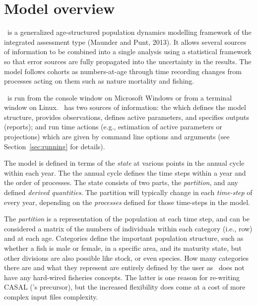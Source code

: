 \section{Model overview\label{sec:overview}}

\CNAME~is a generalized age-structured population dynamics modelling framework of the integrated assessment type (Maunder and Punt, 2013). It allows several sources of information to be combined into a single analysis using a statistical framework so that error sources are fully  propagated into the uncertainty in the results. The model follows cohorts as numbers-at-age through time recording changes from processes acting on them such as nature mortality and fishing.   

\CNAME~is run from the console window on Microsoft Windows or from a terminal window on Linux. \CNAME~has two sources of information: the \emph{\config} which  defines the model structure, provides observations, defines active parameters, and specifies outputs (reports); and run time actions (e.g.,  estimation of active parameters or projections) which are given by command line options and arguments (see Section~\ref{sec:running} for details).

The model is defined in terms of the \emph{state} at various points in the annual cycle within each year. The the annual cycle defines the time steps within a year and the order of processes. The state consists of two parts, the \emph{partition}, and any defined \emph{derived quantities}. The partition will typically change in each \emph{time-step} of every year, depending on the \emph{processes} defined for those time-steps in the model. 

The \emph{partition} is a representation of the population at each time step, and can be considered a matrix of the numbers of individuals within each category (i.e., row) and at each age. Categories define the important population structure, such as whether a fish is male or female, in a specific area, and its maturity state, but other divisions are also possible like stock, or even species. How many categories there are and what they represent are entirely defined by the user as \CNAME~does not have any hard-wired fisheries concepts. The latter is one reason for re-writing CASAL (\CNAME's precursor), but the increased flexibility does come at a cost of more complex input files complexity.

